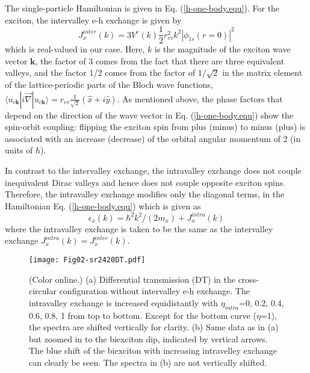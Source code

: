 \documentclass[aps,prb,superscriptaddress,letterpaper,amsmath,amssymb,twocolumn,preprintnumbers]{revtex4}
\begin{document}
The single-particle Hamiltonian is given in Eq. (\ref{h-one-body.equ}). For the exciton, the intervalley e-h exchange is given by \cite{yu-etal.14}
\begin{equation}
J^{inter}_x (k) = 3 V^c(k) \frac{1}{2} r_{cv}^2 k^2 |\phi_{1s}(r=0)|^2
\end{equation}
which is real-valued in our case. Here, $k$ is the magnitude of the exciton wave vector $\textbf{k}$,
the factor of 3 comes from the fact that there are three equivalent valleys, and the factor 1/2 comes from the factor of $1/ \sqrt{2} $ in  the matrix element of the lattice-periodic parts of the  Bloch wave functions,
$\langle u_{c \textbf{k}} |  i \vec{ \nabla } | u_{c \textbf{k}} \rangle  = r_{cv} \frac{1}{ \sqrt{2} } ( \hat{x} + i \hat{y} )$.
As mentioned above, the phase factors that depend on the direction of the wave vector in Eq. (\ref{h-one-body.equ})
show the spin-orbit coupling: flipping the exciton spin from plus (minus) to minus (plus) is associated with an increase (decrease) of the orbital angular momentum of 2 (in units of $\hbar$).




In contrast to the intervalley exchange, the intravalley exchange does not couple inequivalent Dirac valleys and hence does not couple opposite exciton spins. Therefore, the intravalley exchange modifies only the diagonal terms, in the Hamiltonian Eq. (\ref{h-one-body.equ}) which is given as
\begin{equation}
\epsilon^{}_{x} (k) = \hbar^2 k^2 / (2 m_x) +  J^{intra}_{x}(k)
\end{equation}
where the intravalley exchange is taken to be the same as the intervalley exchange $J^{intra}_{x}(k) = J^{inter}_{x}(k)$.









\begin{figure}
	\centering
	\texttt{[image: Fig02-sr2420DT.pdf]}
	\caption{
		(Color online.)
		(a) Differential transmission (DT) in the cross-circular configuration without intervalley e-h exchange. The intravalley exchange is increased equidistantly with $\eta_{intra}$=0, 0.2, 0.4, 0.6, 0.8, 1 from top to bottom. Except for the bottom curve ($\eta$=1), the spectra are shifted vertically
for clarity. (b) Same data as in (a) but zoomed in to the biexciton dip, indicated by vertical arrows. The blue shift of the biexciton with increasing intravelley exchange can clearly be seen.
The spectra in (b) are not vertically shifted. }	
	\label{fig:sr2420DT}
\end{figure}
\end{document}
